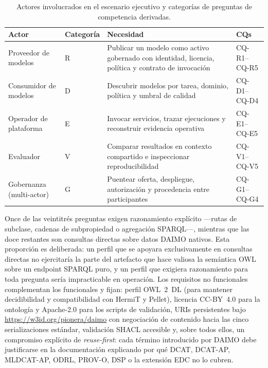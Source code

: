 \documentclass[11pt,a4paper]{article}
\newcommand{\cq}[1]{\textsf{#1}}
\begin{document}
\begin{table}[t]
\caption{Actores involucrados en el escenario ejecutivo y categorías de preguntas de competencia derivadas.}
\label{tab:actors}
\centering
\small
\begin{tabularx}{\textwidth}{@{}L{3.5cm}L{2cm}XL{3cm}@{}}
\toprule
\textbf{Actor} & \textbf{Categoría} & \textbf{Necesidad} & \textbf{CQs} \\
\midrule
Proveedor de modelos & R & Publicar un modelo como activo gobernado con identidad, licencia, política y contrato de invocación & \cq{CQ-R1}--\cq{CQ-R5} \\[0.3em]
Consumidor de modelos & D & Descubrir modelos por tarea, dominio, política y umbral de calidad & \cq{CQ-D1}--\cq{CQ-D4} \\[0.3em]
Operador de plataforma & E & Invocar servicios, trazar ejecuciones y reconstruir evidencia operativa & \cq{CQ-E1}--\cq{CQ-E5} \\[0.3em]
Evaluador & V & Comparar resultados en contexto compartido e inspeccionar reproducibilidad & \cq{CQ-V1}--\cq{CQ-V5} \\[0.3em]
Gobernanza (multi-actor) & G & Puentear oferta, despliegue, autorización y procedencia entre participantes & \cq{CQ-G1}--\cq{CQ-G4} \\
\bottomrule
\end{tabularx}
\end{table}

Once de las veintitrés preguntas exigen razonamiento explícito ---rutas de subclase, cadenas de subpropiedad o agregación SPARQL---, mientras que las doce restantes son consultas directas sobre datos DAIMO nativos. Esta proporción es deliberada: un perfil que se apoyara exclusivamente en consultas directas no ejercitaría la parte del artefacto que hace valiosa la semántica OWL sobre un endpoint SPARQL puro, y un perfil que exigiera razonamiento para toda pregunta sería impracticable en operación. Los requisitos no funcionales complementan los funcionales y fijan: perfil OWL~2~DL (para mantener decidibilidad y compatibilidad con HermiT y Pellet), licencia CC-BY~4.0 para la ontología y Apache-2.0 para los scripts de validación, URIs persistentes bajo \url{https://w3id.org/pionera/daimo} con negociación de contenido hacia las cinco serializaciones estándar, validación SHACL accesible y, sobre todos ellos, un compromiso explícito de \emph{reuse-first}: cada término introducido por DAIMO debe justificarse en la documentación explicando por qué DCAT, DCAT-AP, MLDCAT-AP, ODRL, PROV-O, DSP o la extensión EDC no lo cubren.
\end{document}

